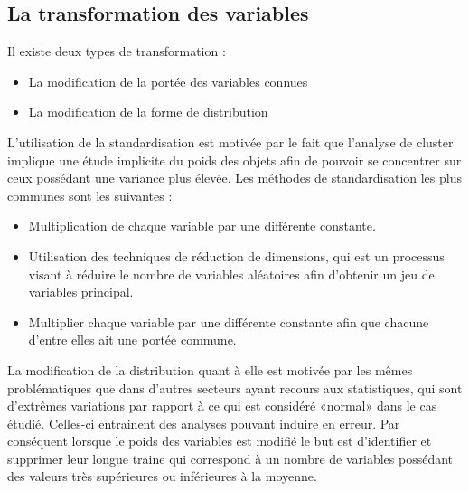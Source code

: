 \documentclass[memoire.tex]{subfiles}
\begin{document}
\subsection{La transformation des variables}
Il existe deux types de transformation : \begin{itemize}
\item La modification de la portée des variables connues
\item{La modification de la forme de distribution}
\end{itemize}
L'utilisation de la standardisation est motivée par le fait que l'analyse de cluster implique une étude implicite du poids des objets afin de pouvoir se concentrer sur ceux possédant une variance plus élevée. Les méthodes de standardisation les plus communes sont les suivantes \cite{ref9} : \begin{itemize}
\item Multiplication de chaque variable par une différente constante.
\item Utilisation des techniques de réduction de dimensions, qui est un processus visant à réduire le nombre de variables aléatoires afin d'obtenir un jeu de variables principal.
\item Multiplier chaque variable par une différente constante afin que chacune d'entre elles ait une portée commune.
\end{itemize}
La modification de la distribution quant à elle est motivée par les mêmes problématiques que dans d'autres secteurs ayant recours aux statistiques, qui sont d'extrêmes variations par rapport à ce qui est considéré «normal» dans le cas étudié. Celles-ci entrainent des analyses pouvant induire en erreur. Par conséquent lorsque le poids des variables est modifié le but est d'identifier et supprimer leur longue traine qui correspond à un nombre de variables possédant des valeurs très supérieures ou inférieures à la moyenne.
\end{document}
